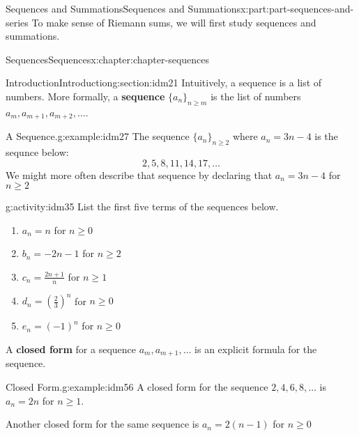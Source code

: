 \documentclass[oneside,10pt,]{book}
\newcommand{\terminology}[1]{\textbf{#1}}
\numberwithin{equation}{section}
\begin{document}
\begin{partptx}{Sequences and Summations}{}{Sequences and Summations}{}{}{x:part:part-sequences-and-series}
 To make sense of Riemann sums, we will first study sequences and summations. %
%
\typeout{************************************************}
\typeout{************************************************}
%
\begin{chapterptx}{Sequences}{}{Sequences}{}{}{x:chapter:chapter-sequences}
%
%
\typeout{************************************************}
\typeout{************************************************}
%
\begin{sectionptx}{Introduction}{}{Introduction}{}{}{g:section:idm21}
Intuitively, a sequence is a list of numbers. More formally, a \terminology{sequence} \(\{a_n\}_{n \geq m}\) is the list of numbers \(a_m, a_{m+1}, a_{m+2}, \dots\).%
\begin{example}{A Sequence.}{g:example:idm27}%
The sequence \(\{a_n\}_{n \geq 2}\) where \(a_n = 3n-4\) is the sequnce below:%
\begin{equation*}
2, 5, 8, 11, 14, 17, \dots
\end{equation*}
We might more often describe that sequence by declaring that \(a_n = 3n-4\) for \(n \geq 2\)%
\end{example}
\begin{activity}{}{g:activity:idm35}%
List the first five terms of the sequences below.%
\begin{enumerate}[font=\bfseries,label=(\alph*),ref=\alph*]
\item{}\(a_n = n\) for \(n \geq 0\)\item{}\(b_n = -2n-1\) for \(n \geq 2\)\item{}\(c_n = \frac{2n+1}{n}\) for \(n \geq 1\)\item{}\(d_n = \left(\frac{2}{3}\right)^n\) for \(n \geq 0\)\item{}\(e_n = (-1)^n\) for \(n \geq 0\)\end{enumerate}
\end{activity}
A \terminology{closed form} for a sequence \(a_m, a_{m+1}, \dots\) is an explicit formula for the sequence.%
\begin{example}{Closed Form.}{g:example:idm56}%
A closed form for the sequence \(2, 4, 6, 8, \dots\) is \(a_n = 2n\) for \(n \geq 1\).%
\par
Another closed form for the same sequence is \(a_n = 2(n-1)\) for \(n \geq 0\)%
\end{example}

\end{sectionptx}
\end{chapterptx}
\end{partptx}
\end{document}
